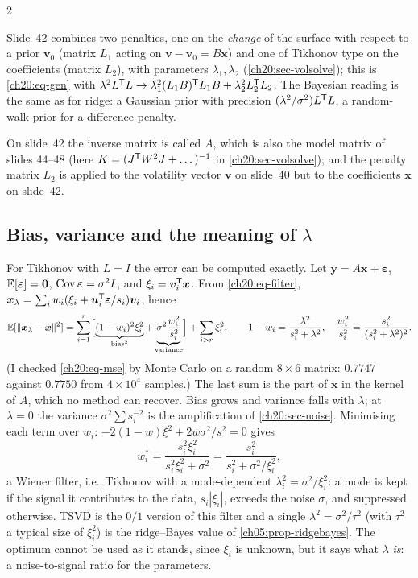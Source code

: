 \begin{paracol}{2}
\begin{itemize}
\end{itemize}
Slide~42 combines two penalties, one on the \emph{change} of the surface with respect to a prior $\bm v_0$ (matrix $L_1$ acting on $\bm v-\bm v_0=B\bm x$) and one of Tikhonov type on the coefficients (matrix $L_2$), with parameters $\lambda_1,\lambda_2$ (\cref{ch20:sec-volsolve}); this is \eqref{ch20:eq-gen} with
$\lambda^2L^{\mathsf T} L\to\lambda_1^2(L_1B)^{\mathsf T} L_1B+\lambda_2^2L_2^{\mathsf T} L_2$. The Bayesian reading is the same as for ridge: a Gaussian prior with precision $(\lambda^2/\sigma^2)L^{\mathsf T} L$, a random-walk prior for a difference penalty.

\begin{coursenote}
On slide~42 the inverse matrix is called $A$, which is also the model matrix of slides 44--48 (here $K=(J^{\mathsf T} W^2J+\dots)^{-1}$ in \cref{ch20:sec-volsolve}); and the penalty matrix $L_2$ is applied to the volatility vector $\bm v$ on slide~40 but to the coefficients $\bm x$ on slide~42.
\end{coursenote}

\subsection{Bias, variance and the meaning of $\lambda$}\label{ch20:sec-biasvar}
For Tikhonov with $L=I$ the error can be computed exactly. Let $\bm y=A\bm x+\bm\varepsilon$, $\mathbb{E}[\bm\varepsilon]=\bm 0$, $\operatorname{Cov}\bm\varepsilon=\sigma^2I$, and $\xi_i=\bm v_i^{\mathsf T}\bm x$. From \eqref{ch20:eq-filter}, $\bm x_\lambda=\sum_iw_i(\xi_i+\bm u_i^{\mathsf T}\bm\varepsilon/s_i)\bm v_i$, hence
\begin{equation}\label{ch20:eq-mse}
  \mathbb{E}[\|\bm x_\lambda-\bm x\|^2]=\sum_{i=1}^r\Bigl[\underbrace{(1-w_i)^2\xi_i^2}_{\text{bias}^2}+\underbrace{\sigma^2\frac{w_i^2}{s_i^2}}_{\text{variance}}\Bigr]+\sum_{i>r}\xi_i^2 ,\qquad 1-w_i=\frac{\lambda^2}{s_i^2+\lambda^2},\quad\frac{w_i^2}{s_i^2}=\frac{s_i^2}{(s_i^2+\lambda^2)^2}.
\end{equation}
(I checked \eqref{ch20:eq-mse} by Monte Carlo on a random $8\times6$ matrix: $0.7747$ against $0.7750$ from $4\times10^4$ samples.) The last sum is the part of $\bm x$ in the kernel of $A$, which no method can recover.
Bias grows and variance falls with $\lambda$; at $\lambda=0$ the variance $\sigma^2\sum s_i^{-2}$ is the amplification of \cref{ch20:sec-noise}. Minimising each term over $w_i$: $-2(1-w)\xi^2+2w\sigma^2/s^2=0$ gives
\begin{equation}\label{ch20:eq-wiener}
  w_i^\ast=\frac{s_i^2\xi_i^2}{s_i^2\xi_i^2+\sigma^2}=\frac{s_i^2}{s_i^2+\sigma^2/\xi_i^2},
\end{equation}
a Wiener filter, i.e.\ Tikhonov with a mode-dependent $\lambda_i^2=\sigma^2/\xi_i^2$: a mode is kept if the signal it contributes to the data, $s_i|\xi_i|$, exceeds the noise $\sigma$, and suppressed otherwise. TSVD is the $0/1$ version of this filter and a single $\lambda^2=\sigma^2/\tau^2$
(with $\tau^2$ a typical size of $\xi_i^2$) is the ridge--Bayes value of \cref{ch05:prop-ridgebayes}. The optimum cannot be used as it stands, since $\xi_i$ is unknown, but it says what $\lambda$ \emph{is}: a noise-to-signal ratio for the parameters.


\end{paracol}
